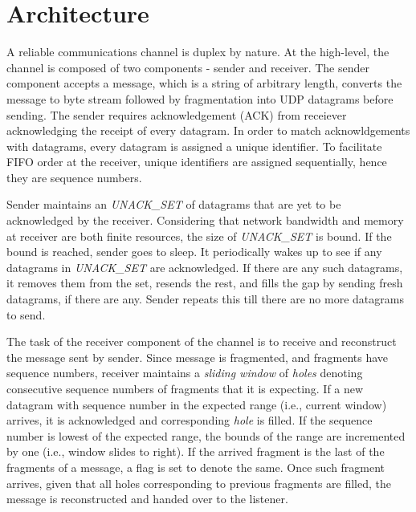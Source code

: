 \section{Architecture}
\label{sec:arch}

A reliable communications channel is duplex by nature. At the
high-level, the channel is composed of two components - sender and
receiver. The sender component accepts a message, which is a string of
arbitrary length, converts the message to byte stream followed by
fragmentation into UDP datagrams before sending. The sender requires
acknowledgement (ACK) from receiever acknowledging the receipt of
every datagram. In order to match acknowldgements with datagrams,
every datagram is assigned a unique identifier. To facilitate FIFO
order at the receiver, unique identifiers are assigned sequentially,
hence they are sequence numbers.

Sender maintains an \emph{UNACK\_SET} of datagrams that are yet to be
acknowledged by the receiver. Considering that network bandwidth and
memory at receiver are both finite resources, the size of
\emph{UNACK\_SET} is bound. If the bound is reached, sender goes to
sleep. It periodically wakes up to see if any datagrams in
\emph{UNACK\_SET} are acknowledged. If there are any such datagrams, it
removes them from the set, resends the rest, and fills the gap by
sending fresh datagrams, if there are any. Sender repeats this till
there are no more datagrams to send.

The task of the receiver component of the channel is to receive and
reconstruct the message sent by sender. Since message is fragmented,
and fragments have sequence numbers, receiver maintains a
\emph{sliding window} of \emph{holes} denoting consecutive sequence numbers
of fragments that it is expecting. If a new datagram with sequence
number in the expected range (i.e., current window) arrives, it is
acknowledged and corresponding \emph{hole} is filled. If the sequence
number is lowest of the expected range, the bounds of the range are
incremented by one (i.e., window slides to right). If the arrived
fragment is the last of the fragments of a message, a flag is set to
denote the same. Once such fragment arrives, given that all holes
corresponding to previous fragments are filled, the message is
reconstructed and handed over to the listener.
